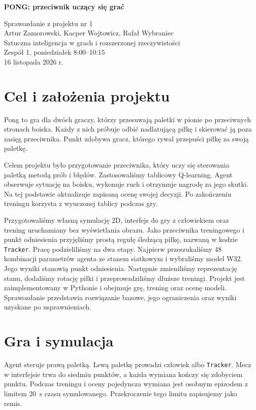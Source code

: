 \documentclass[11pt,a4paper]{article}
\begin{document}
\begin{center}
{\Large\bfseries PONG: przeciwnik uczący się grać\par}
\vspace{7pt}
Sprawozdanie z projektu nr 1\\
Artur Zamorowski, Kacper Wojtowicz, Rafał Wybraniec\\[5pt]
Sztuczna inteligencja w grach i rozszerzonej rzeczywistości\\
Zespół 1, poniedziałek 8:00--10:15\\
16 listopada 2026 r.
\end{center}

\section{Cel i założenia projektu}

Pong to gra dla dwóch graczy, którzy przesuwają paletki w pionie
po przeciwnych stronach boiska. Każdy z nich próbuje odbić nadlatującą
piłkę i skierować ją poza zasięg przeciwnika. Punkt zdobywa gracz,
którego rywal przepuści piłkę za swoją paletkę.

Celem projektu było przygotowanie przeciwnika, który uczy się sterowania
paletką metodą prób i błędów. Zastosowaliśmy tablicowy Q-learning.
Agent obserwuje sytuację na boisku, wykonuje ruch i otrzymuje nagrodę
za jego skutki. Na tej podstawie aktualizuje zapisaną ocenę swojej decyzji.
Po zakończeniu treningu korzysta z wyuczonej tablicy podczas gry.

Przygotowaliśmy własną symulację 2D, interfejs do gry z człowiekiem
oraz trening uruchamiany bez wyświetlania obrazu. Jako przeciwnika
treningowego i punkt odniesienia przyjęliśmy prostą regułę śledzącą piłkę,
nazwaną w kodzie \texttt{Tracker}. Pracę podzieliliśmy na dwa etapy.
Najpierw przeszukaliśmy 48 kombinacji parametrów agenta ze stanem
siatkowym i wybraliśmy model W32. Jego wyniki stanowią punkt odniesienia.
Następnie zmieniliśmy reprezentację stanu, dodaliśmy rotację piłki
i przeprowadziliśmy dłuższe treningi. Projekt jest zaimplementowany
w Pythonie i obejmuje grę, trening oraz ocenę modeli.
Sprawozdanie przedstawia rozwiązanie bazowe, jego ograniczenia
oraz wyniki uzyskane po usprawnieniach.

\section{Gra i symulacja}

Agent steruje prawą paletką. Lewą paletkę prowadzi człowiek albo
\texttt{Tracker}. Mecz w interfejsie trwa do siedmiu punktów, a każda
wymiana kończy się zdobyciem punktu. Podczas treningu i oceny pojedyncza
wymiana jest osobnym epizodem z limitem 20~s czasu symulowanego.
Przekroczenie tego limitu zapisujemy jako remis.
\end{document}
